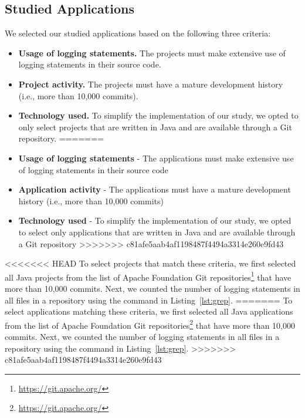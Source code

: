 \subsection{Studied Applications}
We selected our studied applications based on the following three criteria:
\begin{itemize}
<<<<<<< HEAD
	\item \textbf{Usage of logging statements.} The projects must make extensive use of logging statements in their source code.
	\item \textbf{Project activity.} The projects must have a mature development history (i.e., more than 10,000 commits).
	\item \textbf{Technology used.} To simplify the implementation of our study, we opted to only select projects that are written in Java and are available through a Git repository.
=======
	\item \textbf{Usage of logging statements} - The applications must make extensive use of logging statements in their source code
	\item \textbf{Application activity} - The applications must have a mature development history (i.e., more than 10,000 commits)
	\item \textbf{Technology used} - To simplify the implementation of our study, we opted to select only applications that are written in Java and are available through a Git repository
>>>>>>> c81afe5aab4af1198487f4494a3314e260e9fd43
\end{itemize}

<<<<<<< HEAD
To select projects that match these criteria, we first selected all Java projects from the list of Apache Foundation Git repositories\footnote{\url{https://git.apache.org/}} that have more than 10,000 commits. Next, we counted the number of logging statements in all  files in a repository using the  command in Listing~\ref{lst:grep}.
=======
To select applications matching these criteria, we first selected all Java applications from the list of Apache Foundation Git repositories\footnote{\url{https://git.apache.org/}} that have more than 10,000 commits. Next, we counted the number of logging statements in all  files in a repository using the  command in Listing~\ref{lst:grep}.
>>>>>>> c81afe5aab4af1198487f4494a3314e260e9fd43

